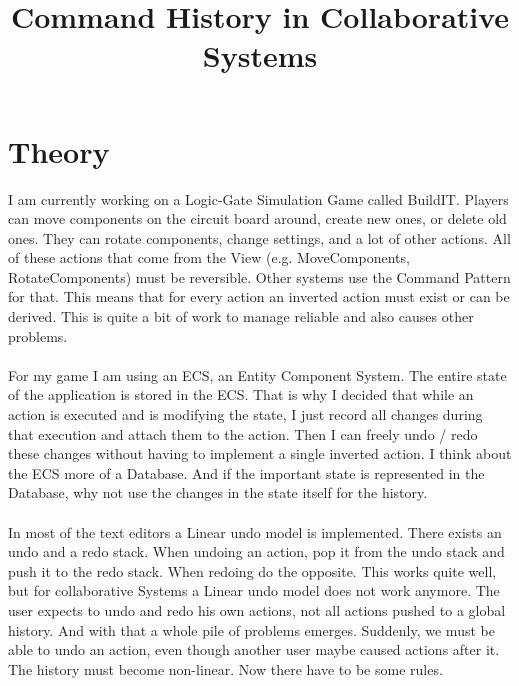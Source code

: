 \documentclass[11pt]{article}
\title{Command History in Collaborative Systems}
\begin{document}
    \section{Theory}

    I am currently working on a Logic-Gate Simulation Game called BuildIT.
    Players can move components on the circuit board around, create new ones, or delete old ones.
    They can rotate components, change settings, and a lot of other actions.
    All of these actions that come from the View (e.g. MoveComponents, RotateComponents) must be
    reversible.
    Other systems use the Command Pattern for that.
    This means that for every action an inverted action must exist or can be derived.
    This is quite a bit of work to manage reliable and also causes other problems.

    \paragraph{}
    For my game I am using an ECS, an Entity Component System.
    The entire state of the application is stored in the ECS.
    That is why I decided that while an action is executed and is modifying the state,
    I just record all changes during that execution and attach them to the action.
    Then I can freely undo / redo these changes without having to implement a single inverted action.
    I think about the ECS more of a Database.
    And if the important state is represented in the Database, why not use the
    changes in the state itself for the history.

    \paragraph{}
    In most of the text editors a Linear undo model is implemented.
    There exists an undo and a redo stack.
    When undoing an action, pop it from the undo stack and push it to the redo stack.
    When redoing do the opposite.
    This works quite well, but for collaborative Systems a Linear undo model does not work anymore.
    The user expects to undo and redo his own actions, not all actions pushed to a global history.
    And with that a whole pile of problems emerges.
    Suddenly, we must be able to undo an action, even though another user maybe caused actions after it.
    The history must become non-linear.
    Now there have to be some rules.
\end{document}
